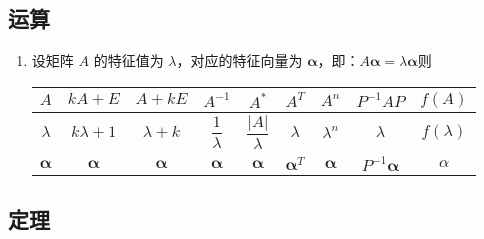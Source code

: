 \documentclass[a4paper,12pt]{article}
\begin{document}
    \subsection{运算}

    \begin{enumerate}
        \item 设矩阵 $A$ 的特征值为 $\lambda$，对应的特征向量为 $\bm{\alpha}$，即：$A\bm{\alpha} = \lambda \bm{\alpha}$则
        \renewcommand{\arraystretch}{2.2} %
        \begin{center}
            \setlength{\tabcolsep}{12pt} %
            \begin{tabular}{c|cccccccc}
                \hline
                \rowcolor{gray!10}
                $A$           & $kA + E$       & $A + kE$      & $A^{-1}$             & $A^{*}$                & $A^{T}$           & $A^{n}$       & $P^{-1}AP$          & $f(A)$       \\
                \hline
                $\lambda$     & $k\lambda + 1$ & $\lambda + k$ & $\dfrac{1}{\lambda}$ & $\dfrac{|A|}{\lambda}$     & $\lambda$ & $\lambda^n$ & $\lambda$  & $f(\lambda)$ \\
                \hline
                $\bm{\alpha}$ & $\bm{\alpha}$  & $\bm{\alpha}$ & $\bm{\alpha}$        & $\bm{\alpha}$          & $\bm{\alpha}^{T}$ & $\bm{\alpha}$ & $P^{-1}\bm{\alpha}$ & $\alpha$  \\
                \hline
            \end{tabular}
        \end{center}
    \end{enumerate}

    \subsection{定理}
\end{document}
